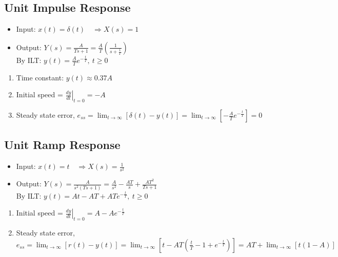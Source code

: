 \documentclass[a4paper]{article}
\begin{document}
\subsection{Unit Impulse Response}
\begin{itemize}
    \item Input: $x(t) = \delta(t)\quad \Rightarrow X(s) = 1$
    \item Output: $Y(s) = \displaystyle\frac{A}{Ts+1} = \frac{A}{T}\left(\frac{1}{s+\frac{1}{T}}\right)$\\
    By ILT: $y(t) = \displaystyle\frac{A}{T}e^{-\frac{t}{T}},\ t\geq 0$
\end{itemize}
\begin{enumerate}
    \item Time constant: $y(t) \approx 0.37A$
    \item Initial speed = $\displaystyle\left.\frac{dy}{dt}\right|_{t=0} = -A$
    \item Steady state error, $e_{ss} = \displaystyle\lim_{t\to\infty}\left[\delta(t)-y(t)\right] = \displaystyle\lim_{t\to\infty}\left[-\displaystyle\frac{A}{T}e^{-\frac{t}{T}}\right] = 0$
\end{enumerate}
\subsection{Unit Ramp Response}
\begin{itemize}
    \item Input: $x(t) = t\quad \Rightarrow X(s) = \displaystyle\frac{1}{s^2}$
    \item Output: $Y(s) = \displaystyle\frac{A}{s^2(Ts+1)} = \frac{A}{s^2}-\frac{AT}{s}+\frac{AT^2}{Ts+1}$\\
    By ILT: $y(t) = At-AT+ATe^{-\frac{t}{T}},\ t\geq 0$
\end{itemize}
\begin{enumerate}
    \item Initial speed = $\displaystyle\left.\frac{dy}{dt}\right|_{t=0} = A-Ae^{-\frac{t}{T}}$
    \item Steady state error, $e_{ss} = \displaystyle\lim_{t\to\infty}\left[r(t)-y(t)\right]=\displaystyle\lim_{t\to\infty}\left[t-AT\left(\displaystyle\frac{t}{T}-1+e^{-\frac{t}{T}}\right)\right] = AT+\displaystyle\lim_{t\to\infty}\left[t(1-A)\right]$
\end{enumerate}
\newpage
\end{document}
